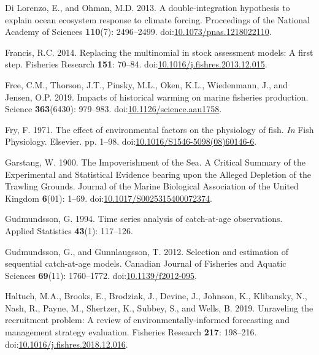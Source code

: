 \documentclass[]{article}
\begin{document}
\leavevmode\hypertarget{ref-dilorenzo2013Doubleintegration}{}%
Di Lorenzo, E., and Ohman, M.D. 2013. A double-integration hypothesis to
explain ocean ecosystem response to climate forcing. Proceedings of the
National Academy of Sciences \textbf{110}(7): 2496--2499.
doi:\href{https://doi.org/10.1073/pnas.1218022110}{10.1073/pnas.1218022110}.

\leavevmode\hypertarget{ref-francis2014Replacing}{}%
Francis, R.C. 2014. Replacing the multinomial in stock assessment
models: A first step. Fisheries Research \textbf{151}: 70--84.
doi:\href{https://doi.org/10.1016/j.fishres.2013.12.015}{10.1016/j.fishres.2013.12.015}.

\leavevmode\hypertarget{ref-free2019Impacts}{}%
Free, C.M., Thorson, J.T., Pinsky, M.L., Oken, K.L., Wiedenmann, J., and
Jensen, O.P. 2019. Impacts of historical warming on marine fisheries
production. Science \textbf{363}(6430): 979--983.
doi:\href{https://doi.org/10.1126/science.aau1758}{10.1126/science.aau1758}.

\leavevmode\hypertarget{ref-fry1971Effect}{}%
Fry, F. 1971. The effect of environmental factors on the physiology of
fish. \emph{In} Fish Physiology. Elsevier. pp. 1--98.
doi:\href{https://doi.org/10.1016/S1546-5098(08)60146-6}{10.1016/S1546-5098(08)60146-6}.

\leavevmode\hypertarget{ref-garstang1900Impoverishment}{}%
Garstang, W. 1900. The Impoverishment of the Sea. A Critical Summary of
the Experimental and Statistical Evidence bearing upon the Alleged
Depletion of the Trawling Grounds. Journal of the Marine Biological
Association of the United Kingdom \textbf{6}(01): 1--69.
doi:\href{https://doi.org/10.1017/S0025315400072374}{10.1017/S0025315400072374}.

\leavevmode\hypertarget{ref-gudmundsson1994Time}{}%
Gudmundsson, G. 1994. Time series analysis of catch-at-age observations.
Applied Statistics \textbf{43}(1): 117--126.

\leavevmode\hypertarget{ref-gudmundsson2012Selection}{}%
Gudmundsson, G., and Gunnlaugsson, T. 2012. Selection and estimation of
sequential catch-at-age models. Canadian Journal of Fisheries and
Aquatic Sciences \textbf{69}(11): 1760--1772.
doi:\href{https://doi.org/10.1139/f2012-095}{10.1139/f2012-095}.

\leavevmode\hypertarget{ref-haltuch2019Unraveling}{}%
Haltuch, M.A., Brooks, E., Brodziak, J., Devine, J., Johnson, K.,
Klibansky, N., Nash, R., Payne, M., Shertzer, K., Subbey, S., and Wells,
B. 2019. Unraveling the recruitment problem: A review of
environmentally-informed forecasting and management strategy evaluation.
Fisheries Research \textbf{217}: 198--216.
doi:\href{https://doi.org/10.1016/j.fishres.2018.12.016}{10.1016/j.fishres.2018.12.016}.
\end{document}

